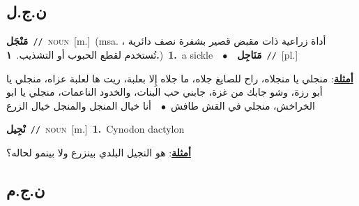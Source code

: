 \documentclass[10pt,a4paper,twoside]{article} %
\begin{document}
\begin{multicols}{2}
\vspace{-3mm}
\subsection*{\color{blue}\foreignlanguage{arabic}{ن.ج.ل}\color{blue}{}} 

{\setlength\topsep{0pt}\textbf{\foreignlanguage{arabic}{مَنْجَل}}\ {\color{gray}\texttt{//}\color{black}}\ \textsc{noun}\ [m.]\ \color{gray}(msa. \foreignlanguage{arabic}{أداة زراعية ذات مقبض قصير بشفرة نصف دائرية ، تُستخدم لقطع الحبوب أو التشذيب.}~\foreignlanguage{arabic}{\textbf{١.}})\color{black}\ \textbf{1.}~a sickle\ \ $\bullet$\ \ \setlength\topsep{0pt}\textbf{\foreignlanguage{arabic}{مَنَاجِل}}\ {\color{gray}\texttt{//}\color{black}}\ [pl.]\  \begin{flushright}\color{gray}\foreignlanguage{arabic}{\textbf{\underline{\foreignlanguage{arabic}{أمثلة}}}: منجلي يا منجلاه، راح للصايغ جلاه، ما جلاه إِلا بعلبة، ريت ها لعلبة عزاه، منجلي يا أبو رزة، وشو جابك من غزة، جابني حب البنات، والخدود الناعمات، منجلي يا ابو الخراخش، منجلي في القش طافش\ $\bullet$\ \  أنا خيال المنجل والمنجل خيال الزرع}\end{flushright}\color{black}} \vspace{2mm}

{\setlength\topsep{0pt}\textbf{\foreignlanguage{arabic}{نْجِيل}}\ {\color{gray}\texttt{//}\color{black}}\ \textsc{noun}\ [m.]\ \textbf{1.}~Cynodon dactylon\  \begin{flushright}\color{gray}\foreignlanguage{arabic}{\textbf{\underline{\foreignlanguage{arabic}{أمثلة}}}: هو النجيل البلدي بينزرع ولا بينمو لحاله؟}\end{flushright}\color{black}} \vspace{2mm}

\vspace{-3mm}
\subsection*{\color{blue}\foreignlanguage{arabic}{ن.ج.م}\color{blue}{}} 


\end{multicols}
\end{document}
